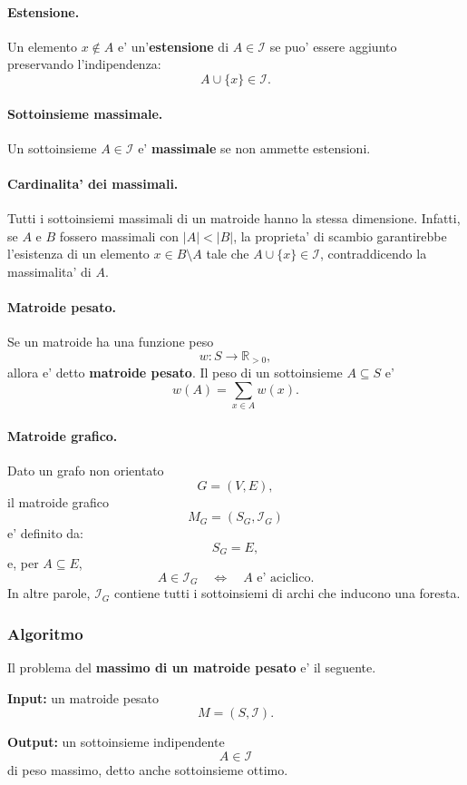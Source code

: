 \paragraph{Estensione.}
Un elemento $x\notin A$ e' un'\textbf{estensione} di $A\in\mathcal{I}$ se puo' essere aggiunto preservando l'indipendenza:
\[
A\cup\{x\}\in\mathcal{I}.
\]

\paragraph{Sottoinsieme massimale.}
Un sottoinsieme $A\in\mathcal{I}$ e' \textbf{massimale} se non ammette estensioni.

\paragraph{Cardinalita' dei massimali.}
Tutti i sottoinsiemi massimali di un matroide hanno la stessa dimensione. Infatti, se $A$ e $B$ fossero massimali con $|A|<|B|$, la proprieta' di scambio garantirebbe l'esistenza di un elemento $x\in B\setminus A$ tale che $A\cup\{x\}\in\mathcal{I}$, contraddicendo la massimalita' di $A$.

\paragraph{Matroide pesato.}
Se un matroide ha una funzione peso
\[
w:S\to\mathbb{R}_{>0},
\]
allora e' detto \textbf{matroide pesato}. Il peso di un sottoinsieme $A\subseteq S$ e'
\[
w(A)=\sum_{x\in A} w(x).
\]

\paragraph{Matroide grafico.}
Dato un grafo non orientato
\[
G=(V,E),
\]
il matroide grafico
\[
M_G=(S_G,\mathcal{I}_G)
\]
e' definito da:
\[
S_G=E,
\]
e, per $A\subseteq E$,
\[
A\in\mathcal{I}_G
\quad\Longleftrightarrow\quad
A\text{ e' aciclico}.
\]
In altre parole, $\mathcal{I}_G$ contiene tutti i sottoinsiemi di archi che inducono una foresta.

\subsubsection{Algoritmo}
Il problema del \textbf{massimo di un matroide pesato} e' il seguente.

\textbf{Input:} un matroide pesato
\[
M=(S,\mathcal{I}).
\]

\textbf{Output:} un sottoinsieme indipendente
\[
A\in\mathcal{I}
\]
di peso massimo, detto anche sottoinsieme ottimo.

